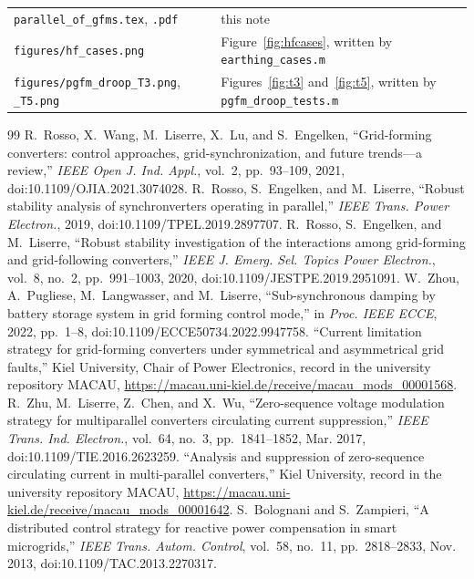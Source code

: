 \documentclass[11pt,a4paper]{scrartcl}
\newcommand{\code}[1]{\texttt{#1}}
\begin{document}
\begin{onehalfspace}
\begin{table}[H]
\begin{tabularx}{0.97\textwidth}{@{} >{\raggedright\arraybackslash}p{} X @{}}
		\code{parallel\_of\_gfms.tex}, \code{.pdf} & this note \\
		\code{figures/hf\_cases.png} & Figure~\ref{fig:hfcases}, written by \code{earthing\_cases.m} \\
		\code{figures/pgfm\_droop\_T3.png}, \code{\_T5.png} & Figures~\ref{fig:t3} and~\ref{fig:t5}, written by \code{pgfm\_droop\_tests.m} \\
		\bottomrule
	\end{tabularx}
\end{table}

\begin{thebibliography}{99}
	\small
	 R.~Rosso, X.~Wang, M.~Liserre, X.~Lu, and S.~Engelken, ``Grid-forming converters: control approaches, grid-synchronization, and future trends---a review,'' \emph{IEEE Open J. Ind. Appl.}, vol.~2, pp.~93--109, 2021, doi:10.1109/OJIA.2021.3074028.
	 R.~Rosso, S.~Engelken, and M.~Liserre, ``Robust stability analysis of synchronverters operating in parallel,'' \emph{IEEE Trans. Power Electron.}, 2019, doi:10.1109/TPEL.2019.2897707.
	 R.~Rosso, S.~Engelken, and M.~Liserre, ``Robust stability investigation of the interactions among grid-forming and grid-following converters,'' \emph{IEEE J. Emerg. Sel. Topics Power Electron.}, vol.~8, no.~2, pp.~991--1003, 2020, doi:10.1109/JESTPE.2019.2951091.
	 W.~Zhou, A.~Pugliese, M.~Langwasser, and M.~Liserre, ``Sub-synchronous damping by battery storage system in grid forming control mode,'' in \emph{Proc. IEEE ECCE}, 2022, pp.~1--8, doi:10.1109/ECCE50734.2022.9947758.
	 ``Current limitation strategy for grid-forming converters under symmetrical and asymmetrical grid faults,'' Kiel University, Chair of Power Electronics, record in the university repository MACAU, \url{https://macau.uni-kiel.de/receive/macau_mods_00001568}.
	 R.~Zhu, M.~Liserre, Z.~Chen, and X.~Wu, ``Zero-sequence voltage modulation strategy for multiparallel converters circulating current suppression,'' \emph{IEEE Trans. Ind. Electron.}, vol.~64, no.~3, pp.~1841--1852, Mar. 2017, doi:10.1109/TIE.2016.2623259.
	 ``Analysis and suppression of zero-sequence circulating current in multi-parallel converters,'' Kiel University, record in the university repository MACAU, \url{https://macau.uni-kiel.de/receive/macau_mods_00001642}.
	 S.~Bolognani and S.~Zampieri, ``A distributed control strategy for reactive power compensation in smart microgrids,'' \emph{IEEE Trans. Autom. Control}, vol.~58, no.~11, pp.~2818--2833, Nov. 2013, doi:10.1109/TAC.2013.2270317.

\end{thebibliography}
\end{onehalfspace}
\end{document}
